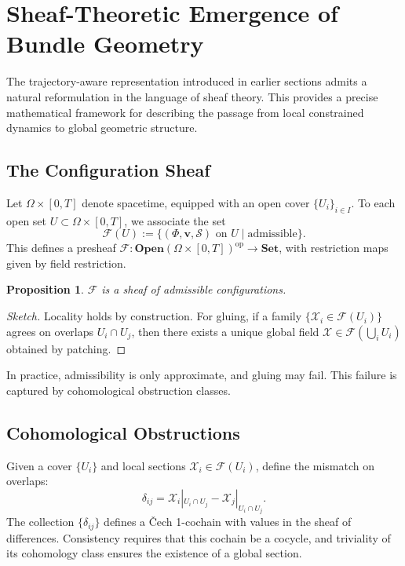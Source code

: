 \documentclass[11pt, a4paper, twocolumn]{article}
\newtheorem{proposition}[definition]{Proposition}
\newcommand{\X}{\mathcal{X}}
\newcommand{\Sfield}{\mathcal{S}}
\begin{document}
\section{Sheaf-Theoretic Emergence of Bundle Geometry}

The trajectory-aware representation introduced in earlier sections admits a
natural reformulation in the language of sheaf theory. This provides a precise
mathematical framework for describing the passage from local constrained
dynamics to global geometric structure.

\subsection{The Configuration Sheaf}

Let $\Omega \times [0,T]$ denote spacetime, equipped with an open cover
$\{U_i\}_{i \in I}$. To each open set $U \subset \Omega \times [0,T]$, we
associate the set
\[
    \mathcal{F}(U)
    :=
    \{ (\Phi, \mathbf{v}, \Sfield) \text{ on } U
    \mid \text{admissible} \}.
\]
This defines a presheaf
$\mathcal{F} : \mathbf{Open}(\Omega \times [0,T])^{\mathrm{op}} \to \mathbf{Set}$,
with restriction maps given by field restriction.

\begin{proposition}
$\mathcal{F}$ is a sheaf of admissible configurations.
\end{proposition}

\begin{proof}[Sketch]
Locality holds by construction. For gluing, if a family
$\{ \X_i \in \mathcal{F}(U_i) \}$ agrees on overlaps $U_i \cap U_j$, then
there exists a unique global field $\X \in \mathcal{F}(\bigcup_i U_i)$
obtained by patching.
\end{proof}

In practice, admissibility is only approximate, and gluing may fail. This
failure is captured by cohomological obstruction classes.

\subsection{Cohomological Obstructions}

Given a cover $\{U_i\}$ and local sections $\X_i \in \mathcal{F}(U_i)$, define
the mismatch on overlaps:
\[
    \delta_{ij} = \X_i|_{U_i \cap U_j} - \X_j|_{U_i \cap U_j}.
\]
The collection $\{\delta_{ij}\}$ defines a \v{C}ech 1-cochain with values in
the sheaf of differences. Consistency requires that this cochain be a cocycle,
and triviality of its cohomology class ensures the existence of a global
section.
\end{document}
